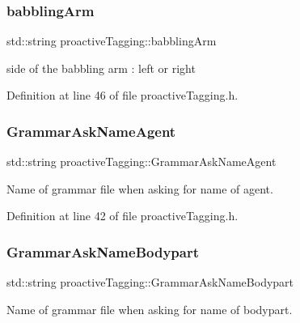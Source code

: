 \subsubsection{\texorpdfstring{babbling\+Arm}{babblingArm}}
{\footnotesize\ttfamily std\+::string proactive\+Tagging\+::babbling\+Arm\hspace{0.3cm}{\ttfamily [protected]}}



side of the babbling arm \+: left or right 



Definition at line 46 of file proactive\+Tagging.\+h.

\mbox{\label{classproactiveTagging_a73f0a523a12bdbb43a78e729b567d416}} 
\subsubsection{\texorpdfstring{Grammar\+Ask\+Name\+Agent}{GrammarAskNameAgent}}
{\footnotesize\ttfamily std\+::string proactive\+Tagging\+::\+Grammar\+Ask\+Name\+Agent\hspace{0.3cm}{\ttfamily [protected]}}



Name of grammar file when asking for name of agent. 



Definition at line 42 of file proactive\+Tagging.\+h.

\mbox{\label{classproactiveTagging_a50b13e3330905f1b19c6a16b94bc67b6}} 
\subsubsection{\texorpdfstring{Grammar\+Ask\+Name\+Bodypart}{GrammarAskNameBodypart}}
{\footnotesize\ttfamily std\+::string proactive\+Tagging\+::\+Grammar\+Ask\+Name\+Bodypart\hspace{0.3cm}{\ttfamily [protected]}}



Name of grammar file when asking for name of bodypart. 



